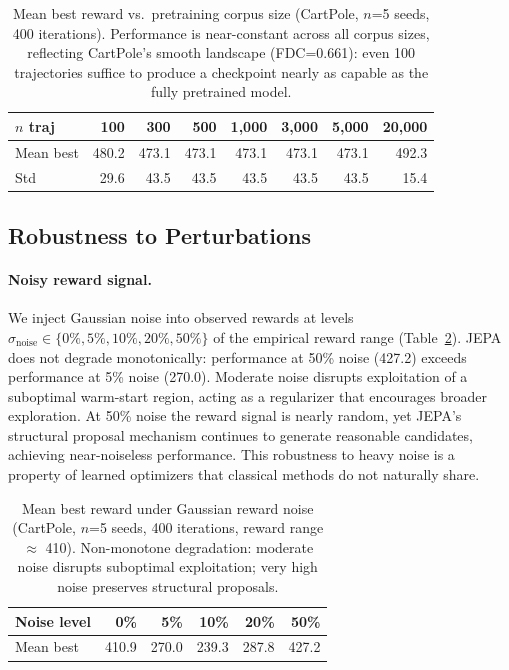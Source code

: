 \begin{table}[t]
\centering
\caption{Mean best reward vs.\ pretraining corpus size
(CartPole, $n$=5 seeds, 400 iterations).
Performance is near-constant across all corpus sizes,
reflecting CartPole's smooth landscape (FDC=0.661):
even 100 trajectories suffice to produce a checkpoint
nearly as capable as the fully pretrained model.}
\label{tab:data_efficiency}
\begin{tabular}{lrrrrrrr}
\toprule
$n$ traj & 100 & 300 & 500 & 1{,}000 & 3{,}000 & 5{,}000 & 20{,}000 \\
\midrule
Mean best & 480.2 & 473.1 & 473.1 & 473.1 & 473.1 & 473.1 & 492.3 \\
Std       & 29.6  & 43.5  & 43.5  & 43.5  & 43.5  & 43.5  & 15.4  \\
\bottomrule
\end{tabular}
\end{table}

\subsection{Robustness to Perturbations}
\label{sec:robustness_perturbations}

\paragraph{Noisy reward signal.}
We inject Gaussian noise into observed rewards at levels
$\sigma_{\mathrm{noise}} \in \{0\%, 5\%, 10\%, 20\%, 50\%\}$ of
the empirical reward range (Table~\ref{tab:noise_robustness}).
JEPA does not degrade monotonically: performance at 50\% noise (427.2)
exceeds performance at 5\% noise (270.0).
Moderate noise disrupts exploitation of a suboptimal warm-start region,
acting as a regularizer that encourages broader exploration.
At 50\% noise the reward signal is nearly random, yet JEPA's structural
proposal mechanism continues to generate reasonable candidates,
achieving near-noiseless performance.
This robustness to heavy noise is a property of learned optimizers
that classical methods do not naturally share.

\begin{table}[t]
\centering
\caption{Mean best reward under Gaussian reward noise
(CartPole, $n$=5 seeds, 400 iterations, reward range $\approx$ 410).
Non-monotone degradation: moderate noise disrupts suboptimal
exploitation; very high noise preserves structural proposals.}
\label{tab:noise_robustness}
\begin{tabular}{lrrrrr}
\toprule
Noise level & 0\% & 5\% & 10\% & 20\% & 50\% \\
\midrule
Mean best & 410.9 & 270.0 & 239.3 & 287.8 & 427.2 \\
\bottomrule
\end{tabular}
\end{table}

